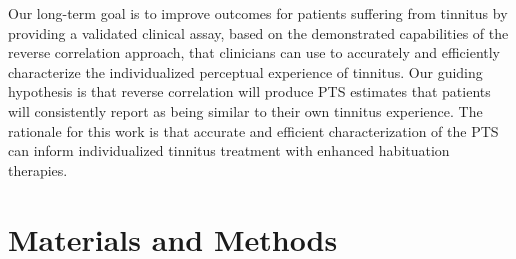 \documentclass[journal]{IEEEtran}
\begin{document}
Our long-term goal is to improve outcomes for patients suffering from tinnitus by providing a validated
clinical assay, based on the demonstrated capabilities of the reverse correlation approach, that clinicians can
use to accurately and efficiently characterize the individualized perceptual experience of tinnitus. Our guiding
hypothesis is that reverse correlation will produce PTS estimates that patients will consistently report as being
similar to their own tinnitus experience. The rationale for this work is that accurate and efficient characterization
of the PTS can inform individualized tinnitus treatment with enhanced habituation therapies.


% 
% 
% 
% 


\section{Materials and Methods }
\end{document}
